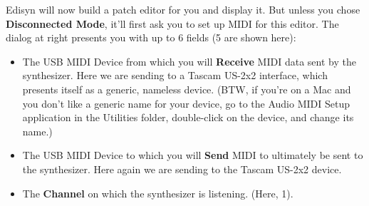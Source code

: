 \documentclass{article}
\begin{document}
Edisyn will now build a patch editor for you and display it.  But unless you chose {\bf Disconnected Mode}, it'll first ask you to set up MIDI for this editor.  The dialog at right presents you with up to 6 fields (5 are shown here):

\begin{itemize}
\item The USB MIDI Device from which you will {\bf Receive} MIDI data sent by the synthesizer.  Here we are sending to a Tascam US-2x2 interface, which presents itself as a generic, nameless device. (BTW, if you're on a Mac and you don't like a generic name for your device, go to the Audio MIDI Setup application in the Utilities folder, double-click on the device, and change its name.)
\item The USB MIDI Device to which you will {\bf Send} MIDI to ultimately be sent to the synthesizer.  Here again we are sending to the Tascam US-2x2 device.
\item The {\bf Channel} on which the synthesizer is listening.  (Here, 1).
\end{itemize}
\end{document}
